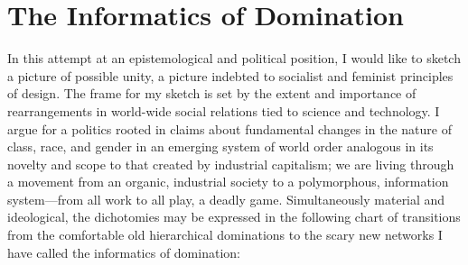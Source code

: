 \documentclass[DIV=12,%
               BCOR=10mm,%
               headinclude=false,%
               footinclude=false,open=any,%
               fontsize=11pt,%
               twoside,%
               paper=210mm:11in]%
               {scrbook}
\begin{document}
\chapter{The Informatics of Domination}


In this attempt at an epistemological and political position, I would like to sketch a picture of possible unity, a picture indebted to socialist and feminist principles of design. The frame for my sketch is set by the extent and importance of rearrangements in world-wide social relations tied to science and technology. I argue for a politics rooted in claims about fundamental changes in the nature of class, race, and gender in an emerging system of world order analogous in its novelty and scope to that created by industrial capitalism; we are living through a movement from an organic, industrial society to a polymorphous, information system—from all work to all play, a deadly game. Simultaneously material and ideological, the dichotomies may be expressed in the following chart of transitions from the comfortable old hierarchical dominations to the scary new networks I have called the informatics of domination:
\end{document}
